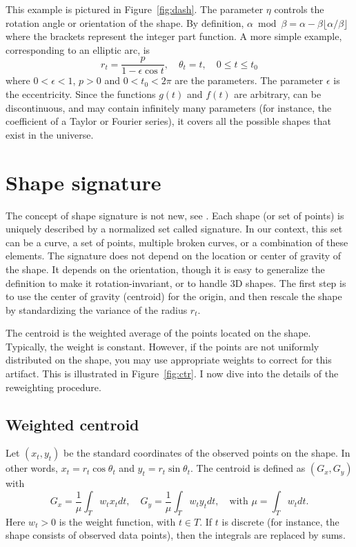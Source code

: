 \documentclass[oneside,10pt]{book}
\begin{document}
\noindent This example is pictured in Figure~\ref{fig:dash}. The parameter $\eta$ controls the rotation angle or orientation of the shape. By definition, $\alpha \bmod \beta =\alpha - \beta\lfloor \alpha/\beta\rfloor$ where the brackets represent the integer part function. A more simple example, corresponding to an elliptic arc, is 
$$r_t=\frac{p}{1-\epsilon\cos t}, \quad \theta_t=t, \quad 0\leq t \leq t_0$$
where $0<\epsilon<1$, $p>0$ and $0<t_0<2\pi$ are the parameters. The parameter $\epsilon$ is the eccentricity. Since the functions $g(t)$ and $f(t)$ are arbitrary, can be discontinuous, and may contain infinitely many parameters (for instance, the coefficient of a Taylor or Fourier series), it covers all the possible shapes that exist in the universe. 

\section{Shape signature}

The concept of shape signature is not new, see \cite{stama2007,fpark2001}. Each shape (or set of points) is uniquely described by a normalized set called \textcolor{index}{signature}. In our context, this set can be a curve, a set of points, multiple broken curves, or a combination of these elements. The signature does not depend on the location or center of gravity of the shape. It depends on the orientation, though it is easy to generalize the definition to make it rotation-invariant, or to handle 3D shapes. The first step is to use the center of gravity (centroid) for the origin, and then rescale the shape by standardizing the variance of the radius $r_t$.

The centroid is the weighted average of the points located on the shape. Typically, the weight is constant. However, if the points are not uniformly distributed on the shape, you may use appropriate weights to correct for this artifact. This is illustrated in Figure~\ref{fig:ctr}. I now dive into the details of the reweighting procedure.

\subsection{Weighted centroid}\label{centr1}

Let $(x_t, y_t)$ be the standard coordinates of the observed points on the shape. In other words, $x_t=r_t \cos\theta_t$ and $y_t=r_t\sin\theta_t$. The centroid is defined as $(G_x,G_y)$ with
\begin{equation}
G_x=\frac{1}{\mu}\int_T w_t x_t dt, \quad G_y= \frac{1}{\mu}\int_T w_t y_t dt, \quad \text{with } \mu=\int_T w_t dt. \label{eq1}
\end{equation}
Here $w_t>0$ is the weight function, with $t\in T$. If $t$ is discrete (for instance, the shape consists of observed data points), then the integrals are replaced by sums.
\end{document}

